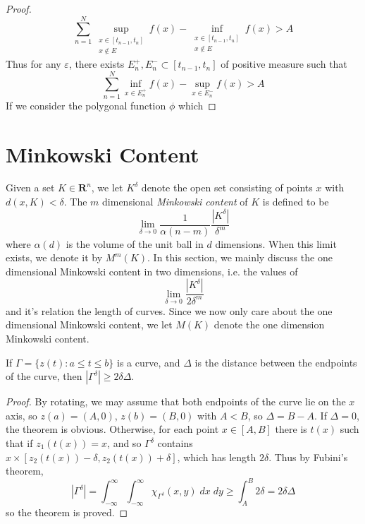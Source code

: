 \begin{proof}
  \[ \sum_{n = 1}^N \sup_{\substack{x \in [t_{n-1},t_n]\\x \not \in E}} f(x) - \inf_{\substack{x \in [t_{n-1},t_n]\\x \not \in E}} f(x) > A \]
  Thus for any $\varepsilon$, there exists $E_n^+, E_n^- \subset [t_{n-1},t_n]$ of positive measure such that
  \[ \sum_{n = 1}^N \inf_{x \in E_n^+} f(x) - \sup_{x \in E_n^-} f(x) > A \]
  If we consider the polygonal function $\phi$ which 
\end{proof}

\section{Minkowski Content}

Given a set $K \in \mathbf{R}^n$, we let $K^\delta$ denote the open set consisting of points $x$ with $d(x,K) < \delta$. The $m$ dimensional \emph{Minkowski content} of $K$ is defined to be
%
\[ \lim_{\delta \to 0} \frac{1}{\alpha(n-m)} \frac{|K^\delta|}{\delta^m} \]
%
where $\alpha(d)$ is the volume of the unit ball in $d$ dimensions. When this limit exists, we denote it by $M^m(K)$. In this section, we mainly discuss the one dimensional Minkowski content in two dimensions, i.e. the values of
%
\[ \lim_{\delta \to 0} \frac{|K^\delta|}{2 \delta^m} \]
%
and it's relation the length of curves. Since we now only care about the one dimensional Minkowski content, we let $M(K)$ denote the one dimension Minkowski content.

\begin{lemma}
  If $\Gamma = \{ z(t): a \leq t \leq b \}$ is a curve, and $\Delta$ is the distance between the endpoints of the curve, then $|\Gamma^\delta| \geq 2 \delta \Delta$.
\end{lemma}
\begin{proof}
  By rotating, we may assume that both endpoints of the curve lie on the $x$ axis, so $z(a) = (A,0)$, $z(b) = (B,0)$ with $A < B$, so $\Delta = B - A$. If $\Delta = 0$, the theorem is obvious. Otherwise, for each point $x \in [A,B]$ there is $t(x)$ such that if $z_1(t(x)) = x$, and so $\Gamma^\delta$ contains $x \times [z_2(t(x)) - \delta, z_2(t(x)) + \delta]$, which has length $2 \delta$. Thus by Fubini's theorem,
  \[ |\Gamma^\delta| = \int_{-\infty}^\infty \int_{-\infty}^\infty \chi_{\Gamma^\delta}(x,y)\; dx \;dy \geq \int_A^B 2 \delta = 2 \delta \Delta \]
  so the theorem is proved.
\end{proof}

